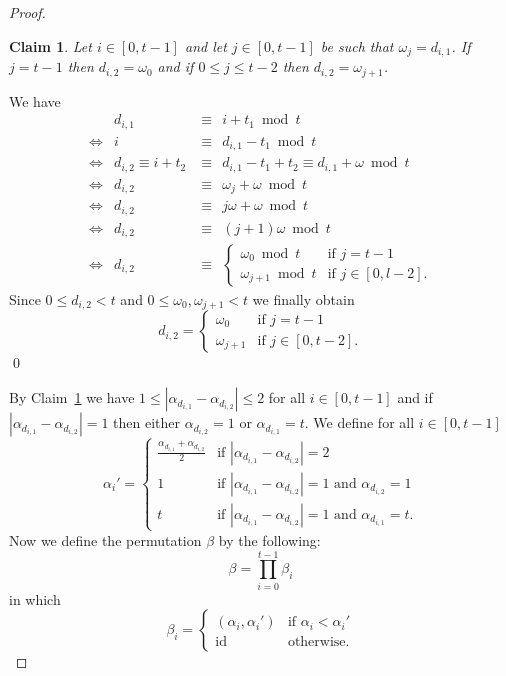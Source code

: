 \documentclass{article}
\newtheorem{claim}{Claim}
\begin{document}
\begin{proof}
\begin{claim}\label{claimreldi1di2}
Let $i \in [0,t-1]$ and let $j \in [0,t-1]$ be such that $\omega_j = d_{i,1}$. If $j=t-1$ then $d_{i,2} = \omega_0$ and if $0 \leq j \leq t-2$ then $d_{i,2} = \omega_{j+1}$.
\end{claim}
We have
\begin{eqnarray*}
& d_{i,1} & \equiv \ \ i + t_1 \bmod t\\
\Leftrightarrow & i & \equiv \ \ d_{i,1} - t_1 \bmod t\\
\Leftrightarrow & d_{i,2} \equiv i + t_2 & \equiv \ \ d_{i,1} - t_1 + t_2 \equiv d_{i,1} + \omega \bmod t\\
\Leftrightarrow & d_{i,2} & \equiv \ \ \omega_j + \omega \bmod t\\
\Leftrightarrow & d_{i,2} & \equiv \ \ j\omega + \omega \bmod t\\
\Leftrightarrow & d_{i,2} & \equiv \ \ (j+1)\omega \bmod t\\
\Leftrightarrow & d_{i,2} & \equiv \ \ \begin{cases}
\omega_0 \bmod t & \text{if } j = t-1\\
\omega_{j+1} \bmod t & \text{if } j \in [0,l-2].
\end{cases}
\end{eqnarray*}
Since $0 \leq d_{i,2} < t$ and $0 \leq \omega_0,\omega_{j+1} < t$ we finally obtain
\begin{displaymath}
d_{i,2} = \begin{cases}
\omega_0 & \text{if } j = t-1\\
\omega_{j+1} & \text{if } j \in [0,t-2].
\end{cases}
\end{displaymath}
\qed

By Claim~\ref{claimreldi1di2} we have $1 \leq |\alpha_{d_{i,1}} - \alpha_{d_{i,2}}| \leq 2$ for all $i \in [0,t-1]$ and if $|\alpha_{d_{i,1}} - \alpha_{d_{i,2}}| = 1$ then either $\alpha_{d_{i,2}} = 1$ or $\alpha_{d_{i,1}} = t$. We define for all $i \in [0,t-1]$
\begin{displaymath}
\alpha_i' = \begin{cases}
\frac{\alpha_{d_{i,1}}+\alpha_{d_{i,2}}}{2} & \text{if } |\alpha_{d_{i,1}} - \alpha_{d_{i,2}}| = 2\\
1 & \text{if } |\alpha_{d_{i,1}} - \alpha_{d_{i,2}}| = 1 \text{ and } \alpha_{d_{i,2}} = 1\\
t & \text{if } |\alpha_{d_{i,1}} - \alpha_{d_{i,2}}| = 1 \text{ and } \alpha_{d_{i,1}} = t.
\end{cases}
\end{displaymath}
Now we define the permutation $\beta$ by the following:
\begin{displaymath}
\beta = \prod_{i=0}^{t-1} \beta_i
\end{displaymath}
in which
\begin{displaymath}
\beta_i = \begin{cases}
(\alpha_i, \alpha_i') & \text{if } \alpha_i < \alpha_i'\\
\mathrm{id} & \text{otherwise}.
\end{cases}
\end{displaymath}


\end{proof}
\end{document}
